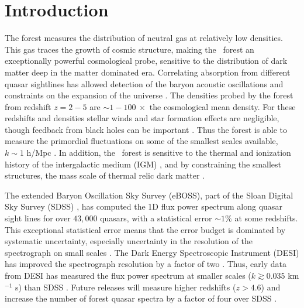 \section{Introduction}\label{sec:intro}

The \lya forest \citep{1965ApJ...142.1633G, 1998ApJ...495...44C, 1998MNRAS.301..478T, 2000ApJ...543....1M, 2001ApJ...552...15H, 2002MNRAS.329..848V, 2006AJ....132..117F, 2006MNRAS.365..231V, 2006ApJS..163...80M} measures the distribution of neutral gas at relatively low densities.
This gas traces the growth of cosmic structure, making the \lya~forest an exceptionally powerful cosmological probe, sensitive to the distribution of dark matter deep in the matter dominated era.
Correlating absorption from different quasar sightlines has allowed detection of the baryon acoustic oscillations and constraints on the expansion of the universe \cite{2011JCAP...09..001S, 2013JCAP...04..026S, 2020ApJ...901..153D, 2022arXiv220913942C}.
The densities probed by the \lya forest from redshift $z=2-5$ are $\sim 1-100 \ \times$ the cosmological mean density.
For these redshifts and densities stellar winds and star formation effects are negligible, though feedback from black holes can be important \citep{2013MNRAS.429.1734V, 2020MNRAS.495.1825C}.
Thus the \lya forest is able to measure the primordial fluctuations on some of the smallest scales available, $k \sim 1$ h/Mpc \citep{2004MNRAS.354..684V, 2005ApJ...635..761M, 2006MNRAS.370L..51V, 2005PhRvD..71j3515S, 2006JCAP...10..014S, 2017JCAP...06..047Y, 2020JCAP...04..038P, 2021JCAP...03..049G}.
In addition, the \lya~forest is sensitive to the thermal and ionization history of the intergalactic medium (IGM) \citep{2008MNRAS.386.1131B,2014MNRAS.438.2499B, 2016MNRAS.463.2335N,2019ApJ...872...13W, 2019ApJ...872..101B, 2019MNRAS.490.3177W,2021MNRAS.506.4389G, 2022ApJ...933...59V}, and by constraining the smallest structures, the mass scale of thermal relic dark matter \citep{2005PhRvD..71f3534V,  2013PhRvD..88d3502V, 2017PhRvD..96b3522I, 2020JCAP...04..038P, 2021MNRAS.502.2356G, 2021PhRvL.126g1302R, 2022arXiv220914220V}.

The extended Baryon Oscillation Sky Survey (eBOSS), part of the Sloan Digital Sky Survey (SDSS) \cite{2019JCAP...07..017C}, has computed the 1D flux power spectrum along quasar sight lines for over $43,000$ quasars, with a statistical error $\sim 1\%$ at some redshifts.
This exceptional statistical error means that the error budget is dominated by systematic uncertainty, especially uncertainty in the resolution of the spectrograph on small scales \cite{2019JCAP...07..017C}.
The Dark Energy Spectroscopic Instrument (DESI) has improved the spectrograph resolution by a factor of two \cite{2022AJ....164..207A}.
Thus, early data from DESI has measured the flux power spectrum at smaller scales ($k \gtrsim 0.035$ km$^{-1}$ s) than SDSS \cite{2023arXiv230606316G, 2023arXiv230606311R}.
Future releases will measure higher redshifts ($z>4.6$) and increase the number of \lya forest quasar spectra by a factor of four over SDSS \cite{2016arXiv161100036D}.

